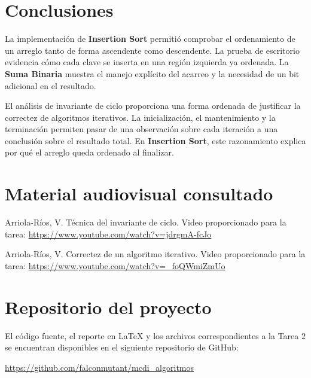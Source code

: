 \documentclass[12pt,letterpaper,oneside]{report}
\begin{document}
\clearpage
\chapter*{Conclusiones}

La implementación de \textbf{Insertion Sort} permitió comprobar el ordenamiento de un
arreglo tanto de forma ascendente como descendente. La prueba de escritorio
evidencia cómo cada clave se inserta en una región izquierda ya ordenada. La \textbf{Suma
Binaria} muestra el manejo explícito del acarreo y la necesidad de un bit
adicional en el resultado.

El análisis de invariante de ciclo proporciona una forma ordenada de justificar
la correctez de algoritmos iterativos. La inicialización, el mantenimiento y la
terminación permiten pasar de una observación sobre cada iteración a una
conclusión sobre el resultado total. En \textbf{Insertion Sort}, este razonamiento explica
por qué el arreglo queda ordenado al finalizar.

\chapter*{Material audiovisual consultado}

Arriola-Ríos, V. Técnica del invariante de ciclo. Video proporcionado para la
tarea: \url{https://www.youtube.com/watch?v=jdrgmA-fcJo}

Arriola-Ríos, V. Correctez de un algoritmo iterativo. Video proporcionado para
la tarea: \url{https://www.youtube.com/watch?v=_foQWmiZmUo}

\chapter*{Repositorio del proyecto}

El código fuente, el reporte en \LaTeX{} y los archivos correspondientes a la Tarea 2 se encuentran disponibles en el siguiente repositorio de GitHub:

\url{https://github.com/falconmutant/mcdi_algoritmos}
\end{document}

